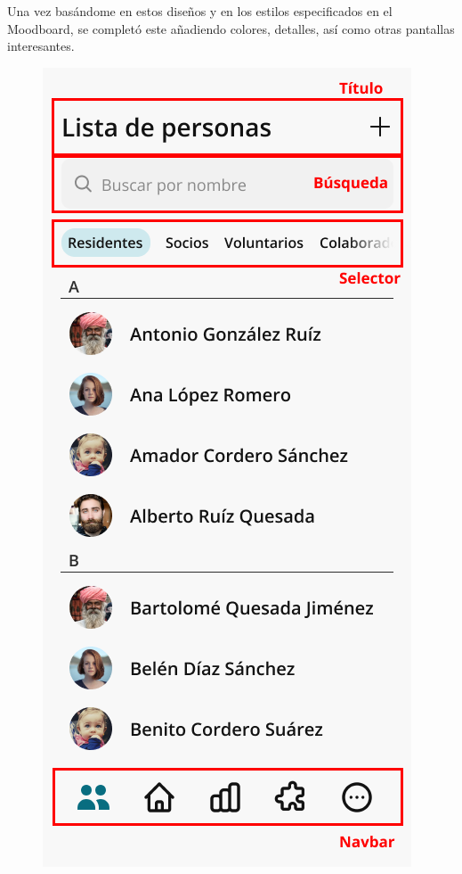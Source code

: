 Una vez basándome en estos diseños y en los estilos especificados en el Moodboard, se completó este añadiendo colores, detalles, así como otras pantallas interesantes.

\begin{figure}[h!]
        \includegraphics[width=\linewidth]{diseno/app/presentacion/secciones.png}

\end{figure}
